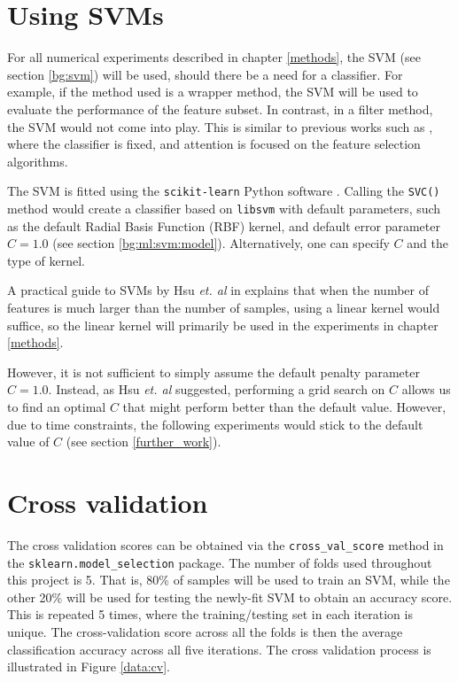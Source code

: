 \documentclass[12pt, twoside, a4paper]{report}
\begin{document}
\section{Using SVMs} \label{data:svms}

For all numerical experiments described in chapter \ref{methods}, the SVM (see section \ref{bg:svm}) will be used, should there be a need for a classifier. For example, if the method used is a wrapper method, the SVM will be used to evaluate the performance of the feature subset. In contrast, in a filter method, the SVM would not come into play. This is similar to previous works such as \cite{RefWorks:216}, where the classifier is fixed, and attention is focused on the feature selection algorithms.

The SVM is fitted using the \texttt{scikit-learn} Python software \cite{scikit-learn}. Calling the \texttt{SVC()} method would create a classifier based on \texttt{libsvm} \cite{libsvm} with default parameters, such as the default Radial Basis Function (RBF) kernel, and default error parameter $C=1.0$ (see section \ref{bg:ml:svm:model}). Alternatively, one can specify $C$ and the type of kernel.

A practical guide to SVMs by Hsu \textit{et. al} in \cite{RefWorks:128} explains that when the number of features is much larger than the number of samples, using a linear kernel would suffice, so the linear kernel will primarily be used in the experiments in chapter \ref{methods}.


However, it is not sufficient to simply assume the default penalty parameter $C=1.0$. Instead, as Hsu \textit{et. al} suggested, performing a grid search on $C$ allows us to find an optimal $C$ that might perform better than the default value. However, due to time constraints, the following experiments would stick to the default value of $C$ (see section \ref{further_work}).



\section{Cross validation}
The cross validation scores can be obtained via the \texttt{cross\_val\_score} method in the \texttt{sklearn.model\_selection} package. The number of folds used throughout this project is 5. That is, 80\% of samples will be used to train an SVM, while the other 20\% will be used for testing the newly-fit SVM to obtain an accuracy score. This is repeated 5 times, where the training/testing set in each iteration is unique. The cross-validation score across all the folds is then the average classification accuracy across all five iterations. The cross validation process is illustrated in Figure \ref{data:cv}.
\end{document}
